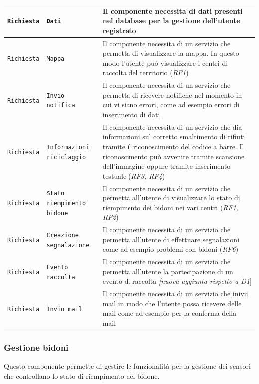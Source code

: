 \documentclass[12pt,a4paper]{article}
\begin{document}
\begin{tabularx}{\textwidth}{@{}llX@{}}
\texttt{Richiesta} & \texttt{Dati} & Il componente necessita di dati presenti nel database per la gestione dell'utente registrato \\ \hline

\texttt{Richiesta} & \texttt{Mappa} & Il componente necessita di un servizio che permetta di visualizzare la mappa. In questo modo l'utente può visualizzare i centri di raccolta del territorio (\textit{RF1}) \\ \hline

\texttt{Richiesta} & \texttt{Invio notifica} & Il componente necessita di un servizio che permetta di ricevere notifiche nel momento in cui vi siano errori, come ad esempio errori di inserimento di dati \\ \hline

\texttt{Richiesta} & \texttt{Informazioni riciclaggio} & Il componente necessita di un servizio che dia informazioni sul corretto smaltimento di rifiuti tramite il riconoscimento del codice a barre. Il riconoscimento può avvenire tramite scansione dell'immagine oppure tramite inserimento testuale (\textit{RF3, RF4}) \\ \hline

\texttt{Richiesta} & \texttt{Stato riempimento bidone} & Il componente necessita di un servizio che permetta all'utente di visualizzare lo stato di riempimento dei bidoni nei  vari centri (\textit{RF1, RF2})\\ \hline

\texttt{Richiesta} & \texttt{Creazione segnalazione} & Il componente necessita di un servizio che permetta all'utente di effettuare segnalazioni come ad esempio problemi con bidoni (\textit{RF6}) \\ \hline

\texttt{Richiesta} & \texttt{Evento raccolta} & Il componente necessita di un servizio che permetta all'utente la partecipazione di un evento di raccolta \textit{[nuova aggiunta rispetto a D1}]\\ \hline

\texttt{Richiesta} & \texttt{Invio mail} & Il componente necessita di un servizio che inivii mail in modo che l'utente possa ricevere delle mail come ad esempio per la conferma della mail\\

\end{tabularx}


\subsubsection{Gestione bidoni}
Questo componente permette di gestire le funzionalità per la gestione dei sensori che controllano lo stato di riempimento del bidone.
\end{document}
